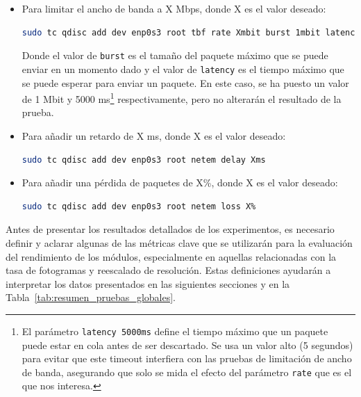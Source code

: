 \begin{itemize}
    \item Para limitar el ancho de banda a X Mbps, donde X es el valor deseado:
    \begin{lstlisting}[language=bash, breaklines=true]
    sudo tc qdisc add dev enp0s3 root tbf rate Xmbit burst 1mbit latency 5000ms
\end{lstlisting}
    Donde el valor de \texttt{burst} es el tamaño del paquete máximo que se puede enviar en un momento dado y el valor de \texttt{latency} es el tiempo máximo que se puede esperar para enviar un paquete. En este caso, se ha puesto un valor de 1 Mbit y 5000 ms\footnote{El parámetro \texttt{latency 5000ms} define el tiempo máximo que un paquete puede estar en cola antes de ser descartado. Se usa un valor alto (5 segundos) para evitar que este timeout interfiera con las pruebas de limitación de ancho de banda, asegurando que solo se mida el efecto del parámetro \texttt{rate} que es el que nos interesa.} respectivamente, pero no alterarán el resultado de la prueba.
    \item Para añadir un retardo de X ms, donde X es el valor deseado:
    \begin{lstlisting}[language=bash]
    sudo tc qdisc add dev enp0s3 root netem delay Xms
\end{lstlisting}
    \item Para añadir una pérdida de paquetes de X\%, donde X es el valor deseado:
    \begin{lstlisting}[language=bash]
    sudo tc qdisc add dev enp0s3 root netem loss X%
\end{lstlisting}
\end{itemize}


\newpage

Antes de presentar los resultados detallados de los experimentos, es necesario definir y aclarar algunas de las métricas clave que se utilizarán para la evaluación del rendimiento de los módulos, especialmente en aquellas relacionadas con la tasa de fotogramas y reescalado de resolución. Estas definiciones ayudarán a interpretar los datos presentados en las siguientes secciones y en la Tabla~\ref{tab:resumen_pruebas_globales}.

